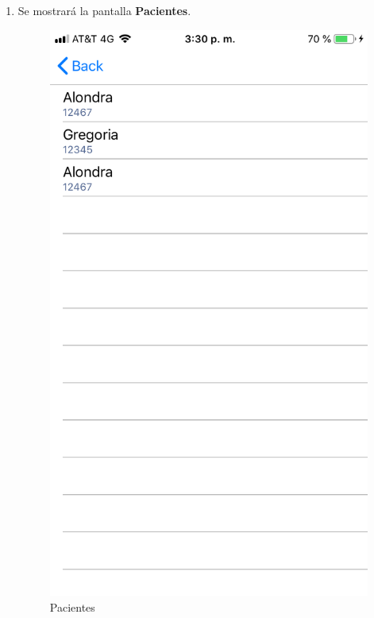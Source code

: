 \begin{enumerate}
	\item Se mostrará la pantalla \textbf{Pacientes}. 
	\newpage
	\begin{figure}[!htbp]			
		\hypertarget{fig:Pacientes}{\hspace{1pt}}
		\begin{center}
			\includegraphics[height=0.4\textheight]{Doctor/ConsultarPacientes/images/Pacientes}
			\caption{Pacientes}
			\label{fig:Pacientes}
		\end{center}
	\end{figure}


\end{enumerate}
